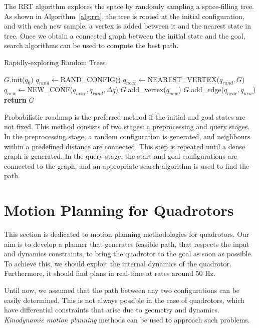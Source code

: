 The RRT algorithm explores the space by randomly sampling a space-filling tree. As shown in Algorithm~\ref{alg:rrt}, the tree is rooted at the initial configuration, and with each new sample, a vertex is added between it and the nearest state in tree. Once we obtain a connected graph between the initial state and the goal, search algorithms can be used to compute the best path. 

\begin{algorithm}
\caption{Rapidly-exploring Random Trees}\label{alg:rrt}
\begin{algorithmic}[1]
\State $G$.init($q_0$)
\State $q_{rand}\gets$RAND\_CONFIG()
\State $q_{near}\gets$NEAREST\_VERTEX($q_{rand},G$)
\State $q_{new}\gets$NEW\_CONF($q_{near}, q_{rand}, \Delta q$)
\State $G$.add\_vertex($q_{new}$)
\State $G$.add\_edge($q_{near},q_{new}$)
\EndFor
\State \textbf{return} $G$
\end{algorithmic}
\end{algorithm}

Probabilistic roadmap is the preferred method if the initial and goal states are not fixed. This method consists of two stages: a preprocessing and query stages. In the preprocessing stage, a random configuration is generated, and neighbours within a predefined distance are connected. This step is repeated until a dense graph is generated. In the query stage, the start and goal configurations are connected to the graph, and an appropriate search algorithm is used to find the path. 

\section{Motion Planning for Quadrotors}
This section is dedicated to motion planning methodologies for quadrotors. 
Our aim is to develop a planner that generates feasible path, that respects the input and dynamics constraints, to bring the quadrotor to the goal as soon as possible. To achieve this, we should exploit the internal dynamics of the quadrotor. Furthermore, it should find plans in real-time at rates around 50 Hz. 

Until now, we assumed that the path between any two configurations can be easily determined. This is not always possible in the case of quadrotors, which have differential constraints that arise due to geometry and dynamics. \textit{Kinodynamic motion planning} \cite{donald1993kinodynamic} methods can be used to approach such problems. 


